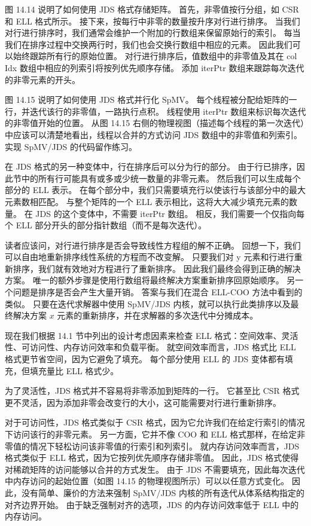 图 14.14 说明了如何使用 JDS 格式存储矩阵。 首先，非零值按行分组，如 CSR 和 ELL 格式所示。 接下来，按每行中非零的数量按升序对行进行排序。 当我们对行进行排序时，我们通常会维护一个附加的行数组来保留原始行的索引。 每当我们在排序过程中交换两行时，我们也会交换行数组中相应的元素。 因此我们可以始终跟踪所有行的原始位置。 对行进行排序后，值数组中的非零值及其在 col Idx 数组中相应的列索引将按列优先顺序存储。 添加 iterPtr 数组来跟踪每次迭代的非零元素的开头。

图 14.15 说明了如何使用 JDS 格式并行化 SpMV。 每个线程被分配给矩阵的一行，并迭代该行的非零值，一路执行点积。 线程使用 iterPtr 数组来标识每次迭代的非零值开始的位置。 从图 14.15 右侧的物理视图（描述每个线程的第一次迭代）中应该可以清楚地看出，线程以合并的方式访问 JDS 数组中的非零值和列索引。 实现 SpMV/JDS 的代码留作练习。

在 JDS 格式的另一种变体中，行在排序后可以分为行的部分。 由于行已排序，因此节中的所有行可能具有或多或少统一数量的非零元素。 然后我们可以生成每个部分的 ELL 表示。 在每个部分中，我们只需要填充行以使该行与该部分中的最大元素数相匹配。 与整个矩阵的一个 ELL 表示相比，这将大大减少填充元素的数量。 在 JDS 的这个变体中，不需要 iterPtr 数组。 相反，我们需要一个仅指向每个 ELL 部分开头的部分指针数组（而不是每次迭代）。

读者应该问，对行进行排序是否会导致线性方程组的解不正确。 回想一下，我们可以自由地重新排序线性系统的方程而不改变解。 只要我们对 y 元素和行进行重新排序，我们就有效地对方程进行了重新排序。 因此我们最终会得到正确的解决方案。 唯一的额外步骤是使用行数组将最终解决方案重新排序回原始顺序。 另一个问题是排序是否会产生大量开销。 答案与我们在混合 ELL-COO 方法中看到的类似。 只要在迭代求解器中使用 SpMV/JDS 内核，就可以执行此类排序以及最终解决方案 $x$ 元素的重新排序，并在求解器的多次迭代中分摊成本。

现在我们根据 14.1 节中列出的设计考虑因素来检查 ELL 格式：空间效率、灵活性、可访问性、内存访问效率和负载平衡。 就空间效率而言，JDS 格式比 ELL 格式更节省空间，因为它避免了填充。 每个部分使用 ELL 的 JDS 变体都有填充，但填充量比 ELL 格式少。

为了灵活性，JDS 格式并不容易将非零添加到矩阵的一行。 它甚至比 CSR 格式更不灵活，因为添加非零会改变行的大小，这可能需要对行进行重新排序。

对于可访问性，JDS 格式类似于 CSR 格式，因为它允许我们在给定行索引的情况下访问该行的非零元素。 另一方面，它并不像 COO 和 ELL 格式那样，在给定非零值的情况下轻松访问该非零值的行索引和列索引。 就内存访问效率而言，JDS 格式类似于 ELL 格式，因为它按列优先顺序存储非零值。 因此，JDS 格式使得对稀疏矩阵的访问能够以合并的方式发生。 由于 JDS 不需要填充，因此每次迭代中内存访问的起始位置（如图 14.15 的物理视图所示）可以以任意方式变化。 因此，没有简单、廉价的方法来强制 SpMV/JDS 内核的所有迭代从体系结构指定的对齐边界开始。 由于缺乏强制对齐的选项，JDS 的内存访问效率低于 ELL 中的内存访问。

